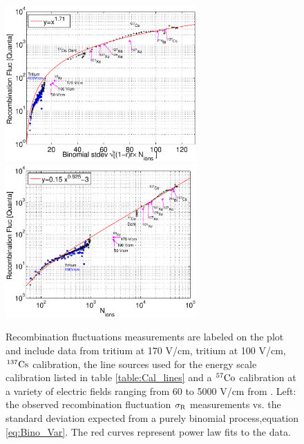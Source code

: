 \renewcommand{\baselinestretch}{1}
\small\normalsize
\begin{figure}[h!]\centering
\includegraphics[width=73mm]{Chapter_Flucs/Figures/alpha/bino_amp_100_iter1.eps}
\includegraphics[width=73mm]{Chapter_Flucs/Figures/alpha/R_v_Ni_100_iter1.eps}
\caption{ Recombination fluctuations measurements are labeled on the plot and include data from tritium at 170 V/cm, tritium at 100 V/cm, $\rm ^{137}Cs$ calibration, the line sources used for the energy scale calibration listed in table \ref{table:Cal_lines} and a $\rm ^{57}Co$ calibration at a variety of electric fields ranging from 60 to 5000 V/cm from \cite{Dahl_Thesis}. Left: the observed recombination fluctuation $\rm \sigma_R$ measurements vs. the standard deviation expected from a purely binomial process,equation \ref{eq:Bino_Var}. The red curves represent power law fits to the data.}
\label{fig:R_Big}
\end{figure}
\renewcommand{\baselinestretch}{2}
\small\normalsize

